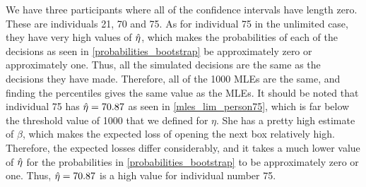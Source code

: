 We have three participants where all of the confidence intervals have length zero. These are individuals 21, 70 and 75. As for individual 75 in the unlimited case, they have very high values of $\hat{\eta}$, which makes the probabilities of each of the decisions as seen in \eqref{probabilities_bootstrap} be approximately zero or approximately one. Thus, all the simulated decisions are the same as the decisions they have made. Therefore, all of the 1000 MLEs are the same, and finding the percentiles gives the same value as the MLEs. It should be noted that individual 75 has $\hat{\eta}=70.87$ as seen in \ref{mles_lim_person75}, which is far below the threshold value of 1000 that we defined for $\eta$. She has a pretty high estimate of $\beta$, which makes the expected loss of opening the next box relatively high. Therefore, the expected losses differ considerably, and it takes a much lower value of $\hat{\eta}$ for the probabilities in \eqref{probabilities_bootstrap} to be approximately zero or one. Thus, $\hat{\eta}=70.87$ is a high value for individual number 75.


